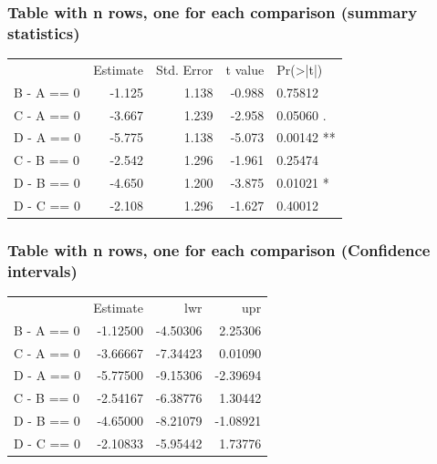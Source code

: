 \documentclass{beamer}
\begin{document}
\begin{frame}
\frametitle{Table with n rows, one for each comparison (summary statistics)}
\begin{table}
\begin{tabular}{lrrrl}
           &Estimate& Std. Error& t value& Pr(>|t|)\\   
B - A == 0&   -1.125&      1.138&  -0.988&  0.75812\\   
C - A == 0&   -3.667&      1.239&  -2.958&  0.05060 .\\ 
D - A == 0&   -5.775&      1.138&  -5.073&  0.00142 **\\
C - B == 0&   -2.542&      1.296&  -1.961&  0.25474 \\  
D - B == 0&   -4.650&      1.200&  -3.875&  0.01021 *\\ 
D - C == 0&   -2.108&      1.296&  -1.627&  0.40012 
\end{tabular}
\end{table} 
\end{frame}

\begin{frame}
\frametitle{Table with n rows, one for each comparison (Confidence intervals)}
\begin{table}
\begin{tabular}{lrrr}
         & Estimate& lwr&      upr\\     
B - A == 0& -1.12500& -4.50306&  2.25306\\
C - A == 0& -3.66667& -7.34423&  0.01090\\
D - A == 0& -5.77500& -9.15306& -2.39694\\
C - B == 0& -2.54167& -6.38776&  1.30442\\
D - B == 0& -4.65000& -8.21079& -1.08921\\
D - C == 0& -2.10833& -5.95442&  1.73776
\end{tabular}
\end{table} 
\end{frame}
\end{document}
